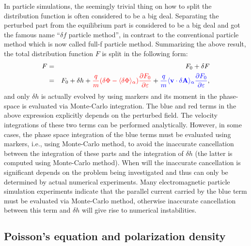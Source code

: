 \documentclass{llncs}
\newcommand{\tmcolor}[2]{{\color{#1}{#2}}}
\begin{document}
In particle simulations, the seemingly trivial thing on how to split the
distribution function is often considered to be a big deal. Separating the
perturbed part from the equilibrium part is considered to be a big deal and
got the famous name ``$\delta f$ particle method'', in contrast to the
conventional particle method which is now called full-f particle method.
Summarizing the above result, the total distribution function $F$ is split in
the following form:
\begin{eqnarray}
  F & = & F_0 + \delta F \nonumber\\
  & = & F_0 + \delta h + \tmcolor{red}{\frac{q}{m} (\delta \Phi - \langle
  \delta \Phi \rangle_{\alpha}) \frac{\partial F_0}{\partial \varepsilon}} +
  \tmcolor{blue}{\frac{q}{m} \langle \mathbf{v} \cdot \delta \mathbf{A}
  \rangle_{\alpha} \frac{\partial F_0}{\partial \varepsilon}}, 
\end{eqnarray}
and only $\delta h$ is actually evolved by using markers and its moment in the
phase-space is evaluated via Monte-Carlo integration. The blue and red terms
in the above expression explicitly depends on the perturbed field. The
velocity integrations of these two terms can be performed analytically.
However, in some cases, the phase space integration of the blue terms must be
evaluated using markers, i.e., using Monte-Carlo method, to avoid the
inaccurate cancellation between the integration of these parts and the
integration of $\delta h$ (the latter is computed using Monte-Carlo method).
When will the inaccurate cancellation is significant depends on the problem
being investigated and thus can only be determined by actual numerical
experiments. Many electromagnetic particle simulation experiments indicate
that the parallel current carried by the blue term must be evaluated via
Monte-Carlo method, otherwise inaccurate cancellation between this term and
$\delta h$ will give rise to numerical instabilities.

\subsection{Poisson's equation and polarization density}\label{19-1-4-1}
\end{document}
